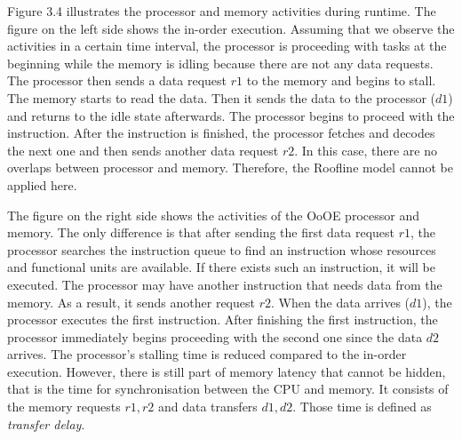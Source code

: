 Figure 3.4 illustrates the processor and memory activities during runtime. The figure on the left side shows the in-order execution. Assuming that we observe the activities in a certain time interval, the processor is proceeding with tasks at the beginning while the memory is idling because there are not any data requests. The processor then sends a data request $r1$ to the memory and begins to stall. The memory starts to read the data. Then it sends the data to the processor ($d1$) and returns to the idle state afterwards. The processor begins to proceed with the instruction. After the instruction is finished, the processor fetches and decodes the next one and then sends another data request $r2$. In this case, there are no overlaps between processor and memory. Therefore, the Roofline model cannot be applied here.

The figure on the right side shows the activities of the OoOE processor and memory. The only difference is that after sending the first data request $r1$, the processor searches the instruction queue to find an instruction whose resources and functional units are available. If there exists such an instruction, it will be executed. The processor may have another instruction that needs data from the memory. As a result, it sends another request $r2$. When the data  arrives ($d1$), the processor executes the first instruction. After finishing the first instruction, the processor immediately begins proceeding with the second one since the data $d2$ arrives.  The processor's stalling time is reduced compared to the in-order execution. However, there is still part of memory latency that cannot be hidden, that is the time for synchronisation between the CPU and memory.  It consists of the memory requests $r1, r2$ and data transfers $d1, d2$. Those time is defined as \textit{transfer delay}.


